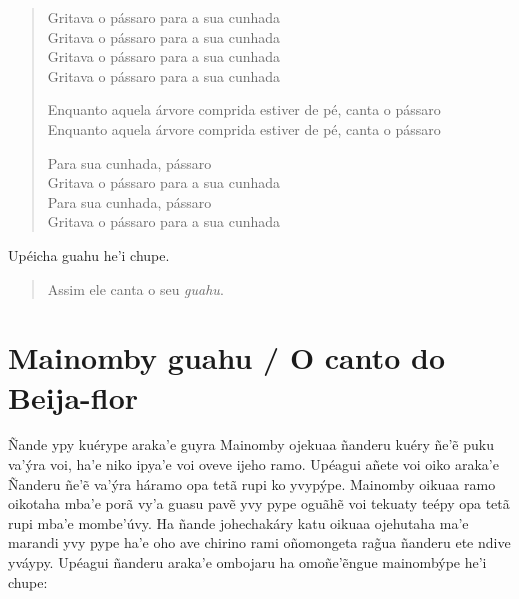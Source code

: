 \begin{itemize}
\begin{verse}
Gritava o pássaro para a sua cunhada\\
Gritava o pássaro para a sua cunhada\\
Gritava o pássaro para a sua cunhada\\
Gritava o pássaro para a sua cunhada

Enquanto aquela árvore comprida estiver de pé, canta o pássaro\\
Enquanto aquela árvore comprida estiver de pé, canta o pássaro

Para sua cunhada, pássaro\\
Gritava o pássaro para a sua cunhada\\
Para sua cunhada, pássaro\\
Gritava o pássaro para a sua cunhada
\end{verse}

Upéicha guahu he'i chupe.

\begin{quote}
Assim ele canta o seu \emph{guahu}.
\end{quote}

\chapter{Mainomby guahu / O canto do Beija-flor}

Ñande ypy kuérype araka'e guyra Mainomby ojekuaa ñanderu kuéry ñe'ẽ puku
va'ýra voi, ha'e niko ipya'e voi oveve ijeho ramo. Upéagui añete voi
oiko araka'e Ñanderu ñe'ẽ va'ýra háramo opa tetã rupi ko yvypýpe.
Mainomby oikuaa ramo oikotaha mba'e porã vy'a guasu pavẽ yvy pype oguãhẽ
voi tekuaty teépy opa tetã rupi mba'e mombe'úvy. Ha ñande johechakáry
katu oikuaa ojehutaha ma'e marandi yvy pype ha'e oho ave chirino rami
oñomongeta rag̃ua ñanderu ete ndive yváypy. Upéagui ñanderu araka'e
ombojaru ha omoñe'ẽngue mainombýpe he'i chupe:


\end{itemize}
